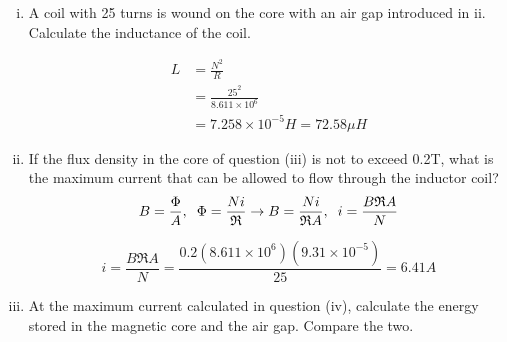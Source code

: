 \documentclass[a4paper,11pt]{article}
\begin{document}
\begin{enumerate}[i.]
    \item A coil with 25 turns is wound on the core with an air gap introduced in ii. Calculate the inductance of the coil.

          \begin{align*}
              L & = \frac{N^2}{R}                     \\
                & =\frac{25^2}{8.611\times 10^6}      \\
                & = 7.258\times 10^{-5}H = 72.58\mu H
          \end{align*}

    \item If the flux density in the core of question (iii) is not to exceed 0.2T, what is the maximum current that can be allowed to flow through the inductor coil?
          $$B = \frac{\Phi}{A}, \hspace{2mm} \Phi = \frac{Ni}{\mathfrak{R}} \rightarrow B = \frac{Ni}{\mathfrak{R}A}, \hspace{2mm}i = \frac{B\mathfrak{R}A}{N}$$

          $$i = \frac{B\mathfrak{R}A}{N} = \frac{0.2(8.611\times10^6)(9.31\times 10^{-5})}{25} = 6.41A$$

          \newpage
    \item At the maximum current calculated in question (iv), calculate the energy stored in the magnetic core and the air gap. Compare the two.


\end{enumerate}
\end{document}
